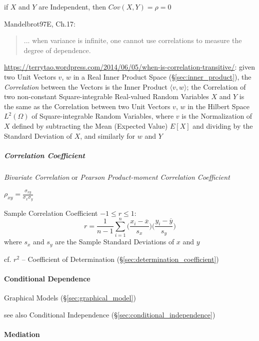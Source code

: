 if $X$ and $Y$ are Independent, then $Cov(X,Y) = \rho = 0$

Mandelbrot97E, Ch.17:
\begin{quote}
  ... when variance is infinite, one cannot use correlations to measure the
  degree of dependence.
\end{quote}

\url{https://terrytao.wordpress.com/2014/06/05/when-is-correlation-transitive/}:
given two Unit Vectors $v$, $w$ in a Real Inner Product Space
(\S\ref{sec:inner_product}), the \emph{Correlation} between the Vectors is the
Inner Product $\langle{v,w}\rangle$; the Correlation of two non-constant
Square-integrable Real-valued Random Variables $X$ and $Y$ is the same as the
Correlation between two Unit Vectors $v$, $w$ in the Hilbert Space $L^2(\Omega)$
of Square-integrable Random Variables, where $v$ is the Normalization of $X$
defined by subtracting the Mean (Expected Value) $E[X]$ and dividing by the
Standard Deviation of $X$, and similarly for $w$ and $Y$



\subparagraph{Correlation Coefficient}\label{sec:correlation_coefficient}\hfill

\emph{Bivariate Correlation} or \emph{Pearson Product-moment Correlation
  Coefficient}

$\rho_{xy} = \frac{\sigma_{xy}}{\sigma_x \sigma_y}$

Sample Correlation Coefficient $-1 \leq r \leq 1$:
\[
  r = \frac{1}{n-1} \sum_{i=1}^n
    \Big(\frac{x_i - \overline{x}}{s_x}\Big)
    \Big(\frac{y_i - \overline{y}}{s_y}\Big)
\]
where $s_x$ and $s_y$ are the Sample Standard Deviations of $x$ and $y$

\fist cf. $r^2$ -- Coefficient of
Determination (\S\ref{sec:determination_coefficient})



\paragraph{Conditional Dependence}\label{sec:conditional_dependence}

Graphical Models (\S\ref{sec:graphical_model})

see also Conditional Independence (\S\ref{sec:conditional_independence})



\paragraph{Mediation}\label{sec:mediation}\hfill

